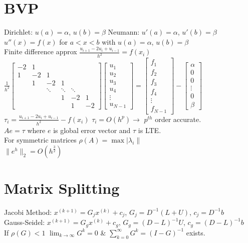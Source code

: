 \documentclass[10pt]{article}
\begin{document}
\section*{BVP}
Dirichlet\@: $u(a)=\alpha$, $u(b)=\beta$ Neumann\@: $u'(a)=\alpha$, $u'(b)=\beta$\\
$u''(x)=f(x)$ for $a<x<b$ with $u(a)=\alpha$, $u(b)=\beta$\\
Finite difference approx $\frac{u_{i+1}-2u_i+u_{i-1}}{h^2}=f(x_i)$\\
$\frac{1}{h^2}\begin{bmatrix}
    -2 & 1 & & & &\\
    1 & -2 & 1 & & &\\
    & 1 & -2 & 1 & &\\
    & & \ddots &\ddots & \ddots&\\
    & & & 1 & -2 & 1\\
    & & & & 1 & -2
\end{bmatrix}\begin{bmatrix}
    u_1\\
    u_2\\
    u_3\\
    u_4\\
    \vdots\\
    u_{N-1}
\end{bmatrix}=\begin{bmatrix}
    f_1\\
    f_2\\
    f_3\\
    f_4\\
    \vdots\\
    f_{N-1}
\end{bmatrix}-\begin{bmatrix}
    \alpha\\
    0\\
    0\\
    \vdots\\
    0\\
    \beta
\end{bmatrix}$\\
$\tau_i=\frac{u_{i+1}-2u_i+u_{i-1}}{h^2}-f(x_i)$ $\tau_i=O(h^p)\rightarrow$ $p^{th}$ order accurate.\\
$Ae=\tau$ where $e$ is global error vector and $\tau$ is LTE.\\
For symmetric matrices $\rho(A)=\max\lvert\lambda_i\rVert$\\
$\lVert e^h\rVert_2=O(h^{\frac{3}{2}})$
\section*{Matrix Splitting}
Jacobi Method\@: $x^{(k+1)}=G_jx^{(k)}+c_j$, $G_j=D^{-1}(L+U)$, $c_j=D^{-1}b$\\
Gauss-Seidel\@: $x^{(k+1)}=G_gx^{(k)}+c_g$, $G_g={(D-L)}^{-1}U$, $c_g={(D-L)}^{-1}b$\\
If $\rho(G)<1$ $\lim_{k\rightarrow\infty}G^k=0$ \& $\sum_{k=0}^{\infty}G^k={(I-G)}^{-1}$ exists. 
\end{document}
